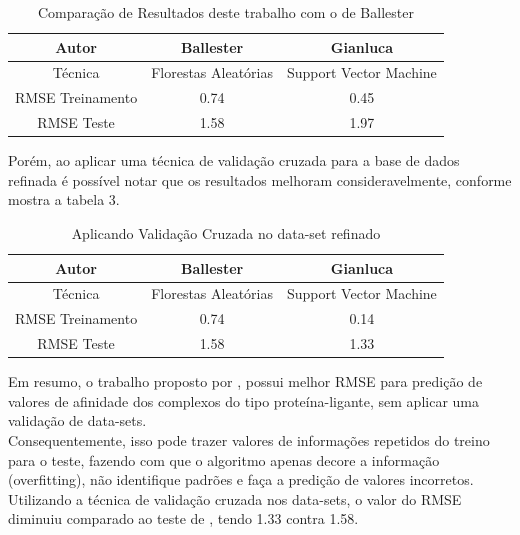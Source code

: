 \documentclass[tcc, capa]{texucpel}
\begin{document}
\begin{table}[h]
\centering
\begin{tabular}{@{}|c|c|c|@{}}
\toprule
Autor 		 					  & Ballester                           &  Gianluca                                                \\ \midrule
Técnica     					&  Florestas Aleatórias       &  Support Vector Machine                      \\ \midrule
RMSE Treinamento    & 0.74 									 & 0.45                                        					   \\ \midrule
RMSE Teste    				&  1.58         						 & 1.97         													\\ \midrule
\end{tabular}
\caption{Comparação de Resultados deste trabalho com o de Ballester}
\end{table}

Porém, ao aplicar uma técnica de validação cruzada para a base de dados refinada é possível notar que os resultados melhoram consideravelmente, conforme mostra a tabela 3.

\begin{table}[h]
\centering
\begin{tabular}{@{}|c|c|c|@{}}
\toprule
Autor 		 					  & Ballester                           &  Gianluca                                                \\ \midrule
Técnica     					&  Florestas Aleatórias       &  Support Vector Machine                      \\ \midrule
RMSE Treinamento    & 0.74 									 &  0.14                                       					   \\ \midrule
RMSE Teste    				&  1.58         						 & 1.33         													\\ \midrule
\end{tabular}
\caption{Aplicando Validação Cruzada no data-set refinado}
\end{table}

Em resumo, o trabalho proposto por \citeauthor{ballester2010machine}, possui melhor RMSE para predição de valores de afinidade dos complexos do tipo proteína-ligante, sem aplicar uma validação de data-sets. \\
Consequentemente, isso pode trazer valores de informações repetidos do treino para o teste, fazendo com que o algoritmo apenas decore a informação (overfitting), não identifique padrões e faça a predição de valores incorretos.\\
Utilizando a técnica de validação cruzada nos data-sets, o valor do RMSE diminuiu comparado ao teste de \citeauthor{ballester2010machine}, tendo 1.33 contra 1.58.
\end{document}
